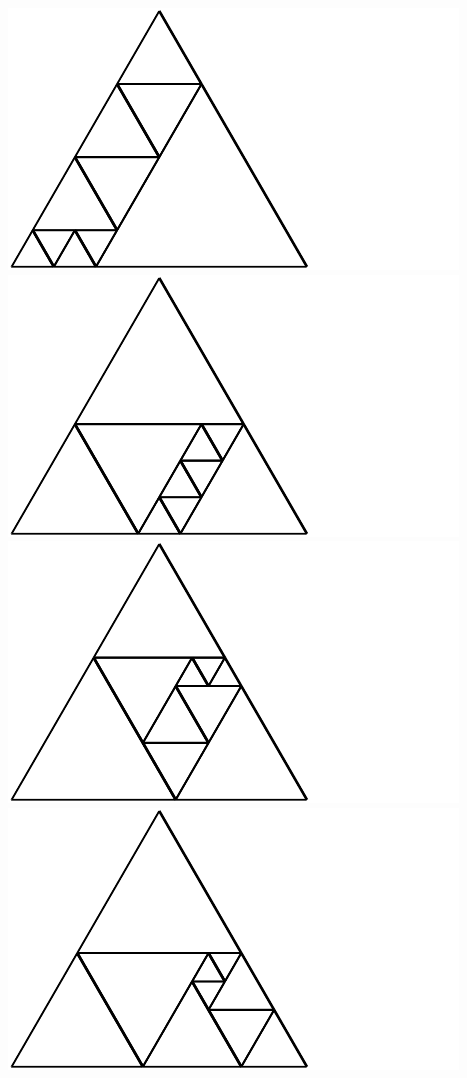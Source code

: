 \documentclass[12pt,amstags,fleqn]{article}
\theoremstyle{plain}
\theoremstyle{definition}
\begin{document}
\includegraphics{output-dissections-dissection10_i17_r3_c1.pdf}
\includegraphics{output-dissections-dissection10_i17_r3_c2.pdf}
\includegraphics{output-dissections-dissection10_i19_r2_c3.pdf}
\includegraphics{output-dissections-dissection10_i19_r3_c1.pdf}
\end{document}

